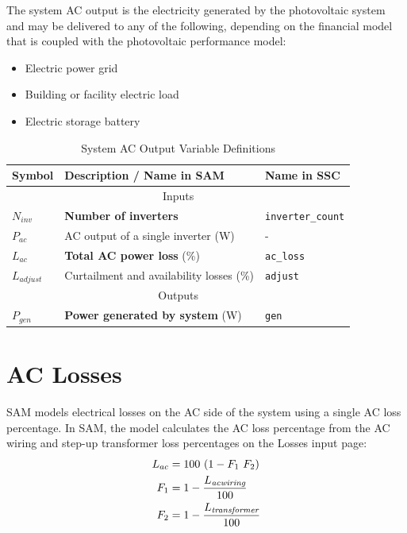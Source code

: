 \documentclass[12pt,letterpaper]{article}
\begin{document}
The system AC output is the electricity generated by the photovoltaic system and may be delivered to any of the following, depending on the financial model that is coupled with the photovoltaic performance model:
\begin{itemize}
\item Electric power grid
\item Building or facility electric load
\item Electric storage battery
\end{itemize}
\begin{table}
\begin{center}
\caption{System AC Output Variable Definitions}
\begin{tabular}{lll}
\midrule
Symbol & Description / \textbf{Name in SAM} & Name in SSC \\
\midrule
\multicolumn{3}{c}{Inputs}\\
$N_{inv}$ & \textbf{Number of inverters} & \texttt{inverter\_count} \\
$P_{ac}$ & AC output of a single inverter (W)& - \\
$L_{ac}$ & \textbf{Total AC power loss} (\%)& \texttt{ac\_loss} \\
$L_{\textit{adjust}}$ & Curtailment and availability losses (\%)& \texttt{adjust} \\
\midrule
\multicolumn{3}{c}{Outputs}\\
$P_{\textit{gen}}$& \textbf{Power generated by system}  (W)& \texttt{gen} \\
\hline
\end{tabular}
\label{tab-systemacoutputvars}
\end{center}
\end{table}

\section{AC Losses}\label{sec-aclosses}

SAM models electrical losses on the AC side of the system using a single AC loss percentage.  In SAM, the model calculates the AC loss percentage from the AC wiring and step-up transformer loss percentages on the Losses input page:
\begin{align}\label{eqn-acderate}
L_{ac} &= 100~(1-F_1~F_2)\notag\\
F_{1} &= 1-\frac{L_{\textit{acwiring}}}{100} \notag\\
F_{2} &= 1-\frac{L_{\textit{transformer}}}{100}
\end{align}
\end{document}

